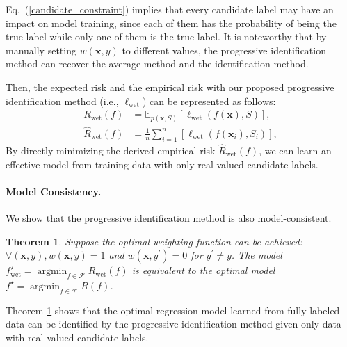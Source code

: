 \documentclass[letterpaper]{article} %
\newtheorem{thm}{Theorem}
\newcommand{\argmin}{\mathop{\arg\min}}
\begin{document}
Eq.~(\ref{candidate_constraint}) implies that every candidate label may have an impact on model training, since each of them has the probability of being the true label while only one of them is the true label. It is noteworthy that by manually setting $w(\bm{x},y)$ to different values, the progressive identification method can recover the average method and the identification method. 

Then, the expected risk and the empirical risk with our proposed progressive identification method (i.e., $\ell_{\mathrm{wet}}$) can be represented as follows:
\begin{align}
\nonumber
R_{\mathrm{wet}}(f)&=\mathbb{E}_{p(\bm{x}, S)}[\ell_{\mathrm{wet}}(f(\bm{x}),S)],\\
\label{weighting_empirical_risk}
\widehat{R}_{\mathrm{wet}}(f)&=\frac{1}{n}\sum\nolimits_{i=1}^n[\ell_{\mathrm{wet}}(f(\bm{x}_i),S_i)],
\end{align}
By directly minimizing the derived empirical risk $\widehat{R}_{\mathrm{wet}}(f)$, we can learn an effective model from training data with only real-valued candidate labels.
\paragraph{Model Consistency.} We show that the progressive identification method is also model-consistent.
\begin{thm}
\label{thm3}
Suppose the optimal weighting function can be achieved: $\forall (\bm{x},y), w(\bm{x},y)=1$ and $w(\bm{x},y^\prime)= 0$ for $y^\prime\neq y$.
The model $f^\star_{\mathrm{wet}}=\argmin_{f\in\mathcal{F}}R_{\mathrm{wet}}(f)$ is equivalent to the optimal model $f^\star = \argmin_{f\in\mathcal{F}}{R}(f)$.
\end{thm}
Theorem \ref{thm3} shows that the optimal regression model learned from fully labeled data can be identified by the progressive identification method given only data with real-valued candidate labels.
\end{document}
